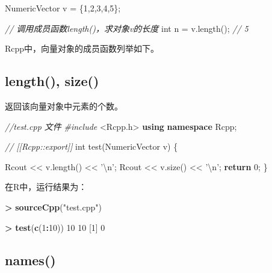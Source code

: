 \documentclass[]{ctexbook}
\newenvironment{Shaded}{\begin{snugshade}}{\end{snugshade}}
\newcommand{\KeywordTok}[1]{\textcolor[rgb]{0.13,0.29,0.53}{\textbf{#1}}}
\newcommand{\DataTypeTok}[1]{\textcolor[rgb]{0.13,0.29,0.53}{#1}}
\newcommand{\DecValTok}[1]{\textcolor[rgb]{0.00,0.00,0.81}{#1}}
\newcommand{\SpecialCharTok}[1]{\textcolor[rgb]{0.00,0.00,0.00}{#1}}
\newcommand{\StringTok}[1]{\textcolor[rgb]{0.31,0.60,0.02}{#1}}
\newcommand{\ImportTok}[1]{#1}
\newcommand{\CommentTok}[1]{\textcolor[rgb]{0.56,0.35,0.01}{\textit{#1}}}
\newcommand{\ControlFlowTok}[1]{\textcolor[rgb]{0.13,0.29,0.53}{\textbf{#1}}}
\newcommand{\OperatorTok}[1]{\textcolor[rgb]{0.81,0.36,0.00}{\textbf{#1}}}
\newcommand{\PreprocessorTok}[1]{\textcolor[rgb]{0.56,0.35,0.01}{\textit{#1}}}
\newcommand{\NormalTok}[1]{#1}
\begin{document}
\begin{Shaded}
\begin{Highlighting}[]
\NormalTok{NumericVector v = \{}\DecValTok{1}\NormalTok{,}\DecValTok{2}\NormalTok{,}\DecValTok{3}\NormalTok{,}\DecValTok{4}\NormalTok{,}\DecValTok{5}\NormalTok{\};}

\CommentTok{// 调用成员函数length()，求对象v的长度}
\DataTypeTok{int}\NormalTok{ n = v.length(); }\CommentTok{// 5}
\end{Highlighting}
\end{Shaded}

Rcpp中，向量对象的成员函数列举如下。

\subsection{length(), size()}\label{vector-length-size}

返回该向量对象中元素的个数。

\begin{Shaded}
\begin{Highlighting}[]
\CommentTok{//test.cpp 文件}
\PreprocessorTok{#include }\ImportTok{<Rcpp.h>}
\KeywordTok{using} \KeywordTok{namespace}\NormalTok{ Rcpp;}

\CommentTok{// [[Rcpp::export]]}
\DataTypeTok{int}\NormalTok{ test(NumericVector v) \{}
  
\NormalTok{  Rcout << v.length() << }\StringTok{'}\SpecialCharTok{\textbackslash{}n}\StringTok{'}\NormalTok{;}
\NormalTok{  Rcout << v.size() << }\StringTok{'}\SpecialCharTok{\textbackslash{}n}\StringTok{'}\NormalTok{;}
  \ControlFlowTok{return} \DecValTok{0}\NormalTok{;}
\NormalTok{\}}
\end{Highlighting}
\end{Shaded}

在R中，运行结果为：

\begin{Shaded}
\begin{Highlighting}[]
\OperatorTok{>}\StringTok{ }\KeywordTok{sourceCpp}\NormalTok{(}\StringTok{"test.cpp"}\NormalTok{)}

\OperatorTok{>}\StringTok{ }\KeywordTok{test}\NormalTok{(}\KeywordTok{c}\NormalTok{(}\DecValTok{1}\OperatorTok{:}\DecValTok{10}\NormalTok{))}
\DecValTok{10}
\DecValTok{10}
\NormalTok{[}\DecValTok{1}\NormalTok{] }\DecValTok{0}
\end{Highlighting}
\end{Shaded}

\subsection{names()}\label{vector-names}
\end{document}
